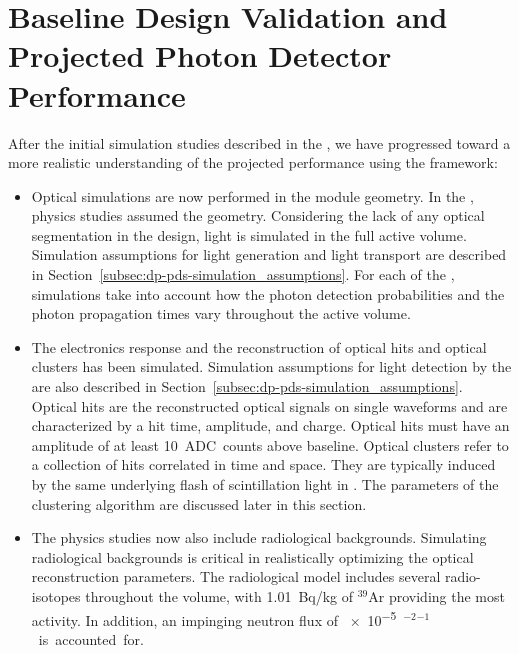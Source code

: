 \section{Baseline Design Validation and Projected Photon Detector Performance}
\label{sec:dp-pds-performance}

After the initial simulation studies described in the  \cite{Abi:2018rgm}, we have progressed toward a more realistic understanding of the projected  performance using the  framework:
%
\begin{itemize}
\item Optical simulations are now performed in the   module geometry. In the  , physics studies assumed the  geometry. Considering the lack of any optical segmentation in the  design, light is simulated in the full \dpactivelarmass {} active volume. Simulation assumptions for light generation and light transport are described in Section~\ref{subsec:dp-pds-simulation_assumptions}. For each of the \dpnumpmtch {}, simulations take into account how the photon detection probabilities and the photon propagation times vary throughout the  active volume.
%
\item The electronics response and the reconstruction of optical hits and optical clusters has been simulated. Simulation assumptions for light detection by the  are also described in Section~\ref{subsec:dp-pds-simulation_assumptions}. Optical hits are the reconstructed optical signals on single  waveforms and are characterized by a hit time, amplitude, and charge. Optical hits must have an amplitude of at least \SI{10}{ADC counts} above baseline. Optical clusters refer to a collection of  hits correlated in time and space. They are typically induced by the same underlying flash of scintillation light in \lar. The parameters of the clustering algorithm are discussed later in this section.

%
\item The physics studies now also include radiological backgrounds. Simulating radiological backgrounds is critical in realistically optimizing the optical reconstruction parameters. The radiological model includes several radio-isotopes throughout the \lar volume, with \SI{1.01}{\becquerel/\kg} of $^{39}$Ar providing the most activity. In addition, an impinging neutron flux of \SI{e-5}{\cm$^{-2}$\s$^{-1}$} is accounted for.
\end{itemize} 


